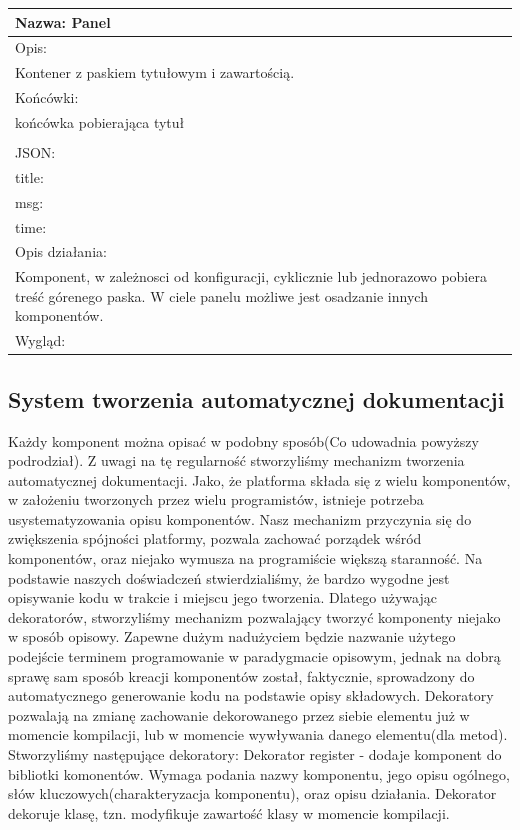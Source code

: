 \documentclass[licencjacka]{pracamgr}
\begin{document}
\begin{tabularx}{\linewidth}{|l}\hline
Nazwa:
Panel
\\\hline
Opis:\\

Kontener z paskiem tytułowym i zawartością.\\\hline
Końcówki:\\
końcówka pobierająca tytuł\\
\\\hline
JSON: \\
title: \\
msg:\\
time:\\\hline
Opis działania:\\
Komponent, w zależnosci od konfiguracji, cyklicznie lub jednorazowo pobiera treść
górenego paska. W ciele panelu możliwe jest osadzanie innych komponentów.\\\hline
Wygląd:\\\hline
\end{tabularx}

\subsection{System tworzenia automatycznej dokumentacji}
Każdy komponent można opisać w podobny sposób(Co udowadnia powyższy podrodział).
Z uwagi na tę regularność stworzyliśmy mechanizm tworzenia automatycznej dokumentacji.
Jako, że platforma składa się z wielu komponentów, w założeniu tworzonych przez wielu
programistów, istnieje potrzeba usystematyzowania opisu komponentów.
Nasz mechanizm przyczynia się do zwiększenia spójności platformy, pozwala zachować porządek
wśród komponentów, oraz niejako wymusza na programiście większą staranność.
Na podstawie naszych doświadczeń stwierdzialiśmy, że bardzo wygodne jest opisywanie
kodu w trakcie i miejscu jego tworzenia. Dlatego używając dekoratorów,
stworzyliśmy mechanizm pozwalający tworzyć komponenty niejako w sposób opisowy.
Zapewne dużym nadużyciem będzie nazwanie użytego podejście terminem programowanie w paradygmacie opisowym,
jednak na dobrą sprawę sam sposób kreacji komponentów został, faktycznie, sprowadzony do
automatycznego generowanie kodu na podstawie opisy składowych.
Dekoratory pozwalają na zmianę zachowanie dekorowanego przez siebie elementu już w momencie kompilacji,
lub w momencie wywływania danego elementu(dla metod).
Stworzyliśmy następujące dekoratory:
Dekorator register - dodaje komponent do bibliotki komonentów. Wymaga podania nazwy komponentu,
jego opisu ogólnego, słów kluczowych(charakteryzacja komponentu),
oraz opisu działania. Dekorator dekoruje klasę, tzn. modyfikuje zawartość
klasy w momencie kompilacji.
\end{document}
